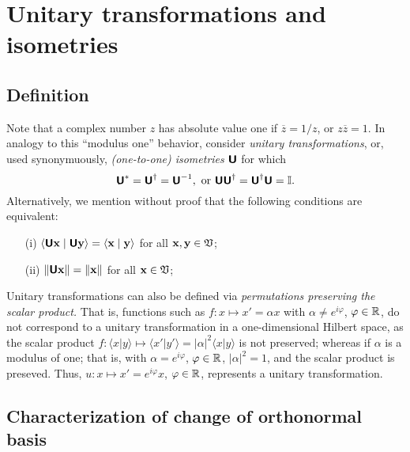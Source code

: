 \section{Unitary transformations and isometries}

\subsection {Definition}
Note that a complex number $z$ has absolute value one if $\overline{z}=1/z$, or $z\overline{z}=1$.
In analogy to this ``modulus one'' behavior,
consider {\em unitary transformations}, or, used synonymuously, {\em (one-to-one) isometries}
$\textsf{\textbf{U}}$ for which
\begin{equation}
\textsf{\textbf{U}}^*= \textsf{\textbf{U}}^\dagger =\textsf{\textbf{U}}^{-1},
\textrm{ or } \textsf{\textbf{U}}\textsf{\textbf{U}}^\dagger =\textsf{\textbf{U}}^\dagger \textsf{\textbf{U}}={\Bbb I}.
\end{equation}
Alternatively, we mention without proof that the following conditions are equivalent:
\begin{itemize}
\item[(i)]
$\langle \textsf{\textbf{U}}{\bf x}\mid \textsf{\textbf{U}}{\bf y} \rangle
=
\langle {\bf x}\mid {\bf y} \rangle$ for all ${\bf x} ,{\bf y} \in {\frak V}$;
\item[(ii)]
$\| \textsf{\textbf{U}}{\bf x}\|
=
\|{\bf x}\|$ for all ${\bf x}  \in {\frak V}$;
\end{itemize}

Unitary transformations can also be defined via {\em permutations preserving the scalar product.}
That is, functions such as
$f: x \mapsto x' =\alpha x$ with $\alpha \neq e^{i\varphi}$, $\varphi \in {\Bbb R}$,
do not correspond to a  unitary transformation in a one-dimensional Hilbert space, as
the scalar product $f:
\langle x \vert y \rangle
\mapsto
\langle x'\vert y'\rangle = \vert \alpha \vert^2 \langle x\vert y\rangle$
is not preserved; whereas if $\alpha$ is a modulus of one; that is,
with $\alpha = e^{i\varphi}$, $\varphi \in {\Bbb R}$,
$\vert \alpha \vert^2=1$, and the scalar product is preseved.
Thus, $u: x \mapsto x' =e^{i\varphi} x$, $\varphi \in {\Bbb R}$,
represents a unitary transformation.

\subsection {Characterization of change of orthonormal basis}

